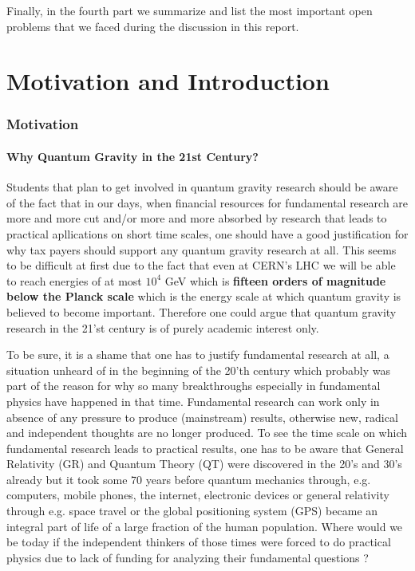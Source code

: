 \documentclass[12pt]{report}
\begin{document}
Finally, in the fourth part we summarize and list the most important 
open problems that we faced during the discussion in this report.



\part{Motivation and Introduction}
\label{s1}


\section{Motivation}
\label{s1.1}

\subsection{Why Quantum Gravity in the 21st Century?}
\label{s1.1.1}

Students that plan to get involved in quantum gravity research should 
be aware of the fact that in our days, when financial resources for 
fundamental research are more and more cut and/or more and more absorbed 
by research
that leads to practical apllications on short time scales, one should
have a good justification for why tax payers should support any quantum 
gravity research at all. 
This seems to be difficult at first due to the fact that even 
at CERN's LHC we will be 
able to reach energies of at most $10^4$ GeV which is {\bf fifteen
orders of magnitude below the Planck scale} which is the energy scale 
at which quantum gravity is believed to become important. Therefore
one could argue that quantum gravity research in the 21'st century is 
of purely academic interest only.

To be sure, it is a shame that one has to justify fundamental research at 
all, a situation unheard of in the beginning of the 20'th century which
probably was part of the reason for why so many breakthroughs especially 
in fundamental physics have happened in that time. Fundamental research
can work only in absence of any pressure to produce (mainstream) results,
otherwise new, radical and independent thoughts are no longer produced.   
To see the time scale on which fundamental research leads to practical
results, one has to be aware that
General Relativity (GR) and Quantum Theory (QT) were discovered 
in the 20's and 30's already but it took some 70 years before 
quantum mechanics through, e.g. computers, mobile phones, the internet,
electronic devices or general relativity through e.g. space travel or the 
global 
positioning system (GPS) became an integral part of life of a large 
fraction of 
the human population. Where would we be today if the independent thinkers 
of those times were forced to do practical physics due to lack of 
funding for analyzing their fundamental questions ?
\end{document}
